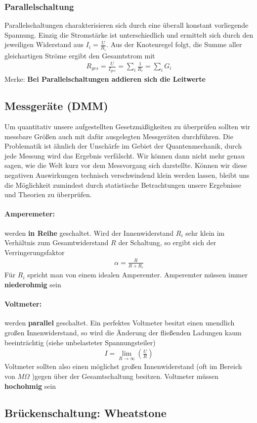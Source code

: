 \subsubsection{Parallelschaltung}
Parallelschaltungen charakterisieren sich durch eine überall konstant vorliegende Spannung. Einzig die Stromstärke ist unterschiedlich und ermittelt sich durch den jeweiligen Widerstand aus $I_i = \tfrac{U}{R_i}$. Aus der Knotenregel folgt, die Summe aller gleichartigen Ströme ergibt den Gesamtstrom mit
\begin{align} \label{eqn:Gesamtwiderstand Parallelschaltung}
\boxed{R_{ges}= \frac{U}{I_{ges}} = \sum\limits_i \frac{1}{R_i} = \sum\limits_i G_i}
\end{align}Merke: \textbf{Bei Parallelschaltungen addieren sich die Leitwerte}

\subsection{Messgeräte (DMM)}
Um quantitativ unsere aufgestellten Gesetzmäßigkeiten zu überprüfen sollten wir messbare Größen auch mit dafür ausgelegten Messgeräten durchführen. Die Problematik ist ähnlich der Unschärfe im Gebiet der Quantenmechanik, durch jede Messung wird das Ergebnis verfälscht. Wir können dann nicht mehr genau sagen, wie die Welt kurz vor dem Messvorgang sich darstellte.
Können wir diese negativen Auswirkungen technisch verschwindend klein werden lassen, bleibt uns die Möglichkeit  zumindest durch statistische Betrachtungen unsere Ergebnisse und Theorien zu überprüfen.
\paragraph{Amperemeter:} werden \textbf{in Reihe} geschaltet. Wird der Innenwiderstand $R_i$ sehr klein im Verhältnis zum Gesamtwiderstand $R$ der Schaltung, so ergibt sich der Verringerungsfaktor \begin{align*}
\alpha = \frac{R}{R+R_i}
\end{align*}Für $R_i$ spricht man von einem idealen Amperemter. Amperemter müssen immer \textbf{niederohmig} sein
\paragraph{Voltmeter:} werden \textbf{parallel} geschaltet. Ein perfektes Voltmeter besitzt einen unendlich großen Innenwiderstand, so wird die Änderung der fließenden Ladungen kaum beeinträchtig (siehe unbelasteter Spannungsteiler)\begin{align*}
I = \lim\limits_{R \rightarrow \infty}\left( \frac{U}{R}\right)
\end{align*}Voltmeter sollten also einen möglichst großen Innenwiderstand (oft im Bereich von $M\Omega$ )gegen über  der Gesamtschaltung besitzen. Voltmeter müssen \textbf{hochohmig} sein

\subsection{Brückenschaltung: Wheatstone }
